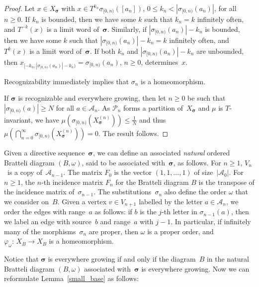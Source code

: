 \documentclass{amsart}
\theoremstyle{definition}
\theoremstyle{remark}
\numberwithin{equation}{section}
\begin{document}
\begin{proof}
Let $x \in X_{\boldsymbol{\sigma}}$ with $x \in T^{k_n}\sigma_{[0,n)}([a_n])$, $0 \le k_n < |\sigma_{[0,n)}(a_n)|$, for all $n \ge 0$. 
If $k_n$ is bounded, then we have some $k$ such that $k_n = k$ infinitely often, and $T^{-k}(x)$ is a limit word of~$\boldsymbol{\sigma}$. 
Similarly, if $|\sigma_{[0,n)}(a_n)|-k_n$ is bounded, then we have some $k$ such that $|\sigma_{[0,n)}(a_n)|-k_n = k$ infinitely often, and $T^k(x)$ is a limit word of~$\boldsymbol{\sigma}$. 
If both $k_n$ and $|\sigma_{[0,n)}(a_n)|-k_n$ are unbounded, then $x_{[-k_n, |\sigma_{[0,n)}(a_n)|-k_n)} = \sigma_{[0,n)}(a_n)$, $n \ge 0$, determines~$x$.

Recognizability immediately implies that $\sigma_n$ is a homeomorphism.  

If $\boldsymbol{\sigma}$ is recognizable and everywhere growing, then let $n \ge 0$ be such that $|\sigma_{[0,n)}(a)| \ge N$ for all $a \in \mathcal{A}_n$. 
As $\mathcal{P}_n$ forms a partition of~$X_{\boldsymbol{\sigma}}$ and $\mu$ is $T$-invariant, we have $\mu(\sigma_{[0,n)}(X_{\boldsymbol{\sigma}}^{(n)})) \le \frac{1}{N}$ and thus $\mu(\bigcap_{n=0}^{\infty} \sigma_{[0,n)}(X_{\boldsymbol{\sigma}}^{(n)})) = 0$.
The result follows.
\end{proof}

Given a directive sequence~$\boldsymbol{\sigma}$, we can define an associated \emph{natural}  ordered Bratteli diagram $(B,\omega)$, said to  be associated with~$\boldsymbol{\sigma}$, as follows. 
For $n\geq 1$, $V_n$~is a copy of~$\mathcal{A}_{n-1}$. 
The matrix $F_0$ is the vector $(1,1,\ldots,1)$ of size~$|\mathcal{A}_0|$. 
For $n\geq 1$, the $n$-th incidence matrix $F_n$ for the Bratteli diagram $B$ is the transpose of the incidence matrix of~$\sigma_{n-1}$. 
The substitutions~$\sigma_n$ also define the order $\omega$  that we consider on~$B$. 
Given a vertex $v \in V_{n+1}$ labelled by the letter $a \in \mathcal{A}_{n}$, we order the edges with range~$a$ as follows: if $b$ is the $j$-th letter in $\sigma_{n-1}(a)$, then we label an edge with source~$b$ and range~$a$ with $j{-}1$. 
In particular, if infinitely many of the morphisms~$\sigma_n$ are proper, then $\omega$ is a proper order, and $\varphi_\omega:\, X_B \to X_B$ is a homeomorphism.

Notice that $\boldsymbol{\sigma}$ is everywhere growing if and only if the diagram~$B$ in the natural Bratteli diagram $(B,\omega)$  associated with~$\boldsymbol{\sigma}$ is everywhere growing. 
Now we can reformulate Lemma~\ref{small_base} as follows: 
\end{document}
